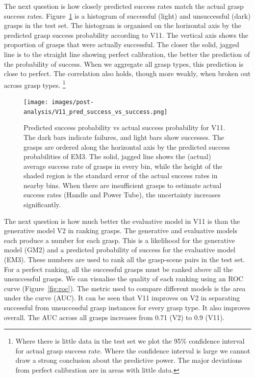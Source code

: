 The next question is how closely predicted success rates match the actual grasp success rates. Figure~\ref{fig:calibrate} is a histogram of successful (light) and unsuccessful (dark) grasps in the test set. The histogram is organised on the horizontal axis by the predicted grasp success probability according to V11. The vertical axis shows the proportion of grasps that were actually successful. The closer the solid, jagged line is to the straight line showing perfect calibration, the better the prediction of the probability of success. When we aggregate all grasp types, this prediction is close to perfect. The correlation also holds, though more weakly, when broken out across grasp types. \footnote{Where there is little data in the test set we plot the 95\% confidence interval for actual grasp success rate. Where the confidence interval is large we cannot draw a strong conclusion about the predictive power. The major deviations from perfect calibration are in areas with little data.}

\begin{figure}[h]
\centering
\texttt{[image: images/post-analysis/V11\_pred\_success\_vs\_success.png]}
\caption{Predicted success probability vs actual success probability for V11. The dark bars indicate failures, and light bars show successes. The grasps are ordered along the horizontal axis by the predicted success probabilities of EM3. The solid, jagged line shows the (actual) average success rate of grasps in every bin, while the height of the shaded region is the standard error of the actual success rates in nearby bins. When there are insufficient grasps to estimate actual success rates (Handle and Power Tube), the uncertainty increases significantly.}
\label{fig:calibrate}
\end{figure}

The next question is how much better the evaluative model in V11 is than the generative model V2 in ranking grasps. The generative and evaluative models each produce a number for each grasp. This is a likelihood for the generative model (GM2) and a predicted probability of success for the evaluative model (EM3). These numbers are used to rank all the grasp-scene pairs in the test set. For a perfect ranking, all the successful grasps must be ranked above all the unsuccessful grasps. We can visualise the quality of each ranking using an ROC curve (Figure~\ref{fig:roc}). The metric used to compare different models is the area under the curve (AUC). It can be seen that V11 improves on V2 in separating successful from unsuccessful grasp instances for every grasp type. It also improves overall. The AUC across all grasps increases from 0.71 (V2) to 0.9 (V11). 

